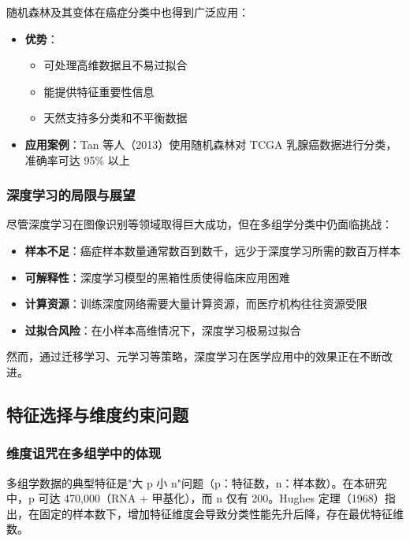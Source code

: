 随机森林及其变体在癌症分类中也得到广泛应用：

\begin{itemize}
    \item \textbf{优势}：
    \begin{itemize}
        \item 可处理高维数据且不易过拟合
        \item 能提供特征重要性信息
        \item 天然支持多分类和不平衡数据
    \end{itemize}
    
    \item \textbf{应用案例}：Tan 等人（2013）使用随机森林对 TCGA 乳腺癌数据进行分类，准确率可达 95\% 以上
\end{itemize}

\subsubsection{深度学习的局限与展望}

尽管深度学习在图像识别等领域取得巨大成功，但在多组学分类中仍面临挑战：

\begin{itemize}
    \item \textbf{样本不足}：癌症样本数量通常数百到数千，远少于深度学习所需的数百万样本
    \item \textbf{可解释性}：深度学习模型的黑箱性质使得临床应用困难
    \item \textbf{计算资源}：训练深度网络需要大量计算资源，而医疗机构往往资源受限
    \item \textbf{过拟合风险}：在小样本高维情况下，深度学习极易过拟合
\end{itemize}

然而，通过迁移学习、元学习等策略，深度学习在医学应用中的效果正在不断改进。

\subsection{特征选择与维度约束问题}

\subsubsection{维度诅咒在多组学中的体现}

多组学数据的典型特征是"大 p 小 n"问题（p：特征数，n：样本数）。在本研究中，p 可达 470,000（RNA + 甲基化），而 n 仅有 200。Hughes 定理（1968）指出，在固定的样本数下，增加特征维度会导致分类性能先升后降，存在最优特征维数。

